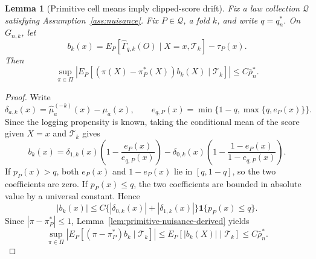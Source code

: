 \documentclass[11pt]{article}
\newcommand{\one}{\mathbf{1}}
\theoremstyle{definition}
\theoremstyle{plain}
\newtheorem{lemma}{Lemma}
\theoremstyle{remark}
\begin{document}
\begin{lemma}[Primitive cell means imply clipped-score drift]\label{lem:drift-derived}
Fix a law collection \(\mathcal Q\) satisfying
Assumption~\ref{ass:nuisance}.  Fix \(P\in\mathcal Q\), a fold \(k\), and
write \(q=q_n^*\).  On \(G_{n,k}\), let
\[
b_k(x)=E_P[\widehat\Gamma_{q,k}(O)\mid X=x,\mathcal T_k]-\tau_P(x).
\]
Then
\[
\sup_{\pi\in\Pi}
\left|E_P[(\pi(X)-\pi_P^*(X))b_k(X)\mid\mathcal T_k]\right|
\le C\bar\rho_n^*.
\]
\end{lemma}
\begin{proof}
Write
\[
\delta_{a,k}(x)=\widehat\mu_a^{(-k)}(x)-\mu_a(x),
\qquad
e_{q,P}(x)=\min\{1-q,\max\{q,e_P(x)\}\}.
\]
Since the logging propensity is known, taking the conditional mean of the
score given \(X=x\) and \(\mathcal T_k\) gives
\[
b_k(x)
=
\delta_{1,k}(x)\left(1-\frac{e_P(x)}{e_{q,P}(x)}\right)
-\delta_{0,k}(x)\left(1-\frac{1-e_P(x)}{1-e_{q,P}(x)}\right).
\]
If \(p_P(x)>q\), both \(e_P(x)\) and \(1-e_P(x)\) lie in \([q,1-q]\), so the
two coefficients are zero.  If \(p_P(x)\le q\), the two coefficients are
bounded in absolute value by a universal constant.  Hence
\[
|b_k(x)|
\le C\{|\delta_{0,k}(x)|+|\delta_{1,k}(x)|\}\one\{p_P(x)\le q\}.
\]
Since \(|\pi-\pi_P^*|\le1\), Lemma~\ref{lem:primitive-nuisance-derived}
yields
\[
\sup_{\pi\in\Pi}
\left|E_P[(\pi-\pi_P^*)b_k\mid\mathcal T_k]\right|
\le E_P[|b_k(X)|\mid\mathcal T_k]
\le C\bar\rho_n^*.
\]
\end{proof}
\end{document}
